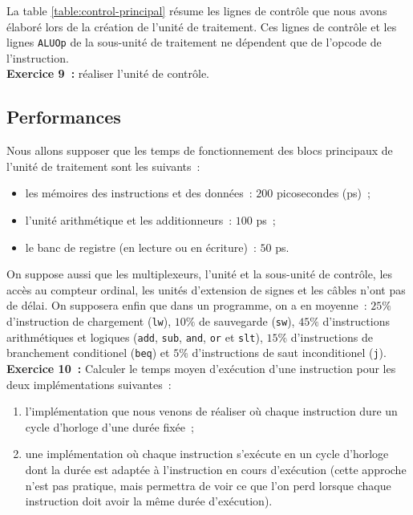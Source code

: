 \documentclass[12pt]{article}
\begin{document}
La table \ref{table:control-principal} résume les lignes de contrôle que nous avons élaboré lors de la création de l'unité de traitement. Ces lignes
de contrôle et les lignes \verb+ALUOp+ de la sous-unité de traitement ne dépendent que de l'opcode de l'instruction.\\

\textbf{Exercice 9~:} réaliser l'unité de contrôle.

\subsection{Performances}

Nous allons supposer que les temps de fonctionnement des blocs principaux de l'unité de traitement sont les suivants~:
\begin{itemize}
\item les mémoires des instructions et des données~: $200$ picosecondes (ps)~;
\item l'unité arithmétique et les additionneurs~: $100$ ps~;
\item le banc de registre (en lecture ou en écriture)~: $50$ ps.\\
\end{itemize}

On suppose aussi que les multiplexeurs, l'unité et la sous-unité de contrôle, les accès au compteur ordinal, les unités d'extension de signes et les câbles
n'ont pas de délai. On supposera enfin que dans un programme, on a en moyenne~: $25\%$ d'instruction de chargement (\verb+lw+), $10\%$ de
sauvegarde (\verb+sw+), $45\%$ d'instructions
arithmétiques et logiques (\verb+add+, \verb+sub+, \verb+and+, \verb+or+ et \verb+slt+), $15\%$ d'instructions de branchement conditionel (\verb+beq+)
et $5\%$ d'instructions de saut inconditionel (\verb+j+).\\

\textbf{Exercice 10~:} Calculer le temps moyen d'exécution d'une instruction pour les deux implémentations suivantes~:
\begin{enumerate}
\item l'implémentation que nous venons de réaliser où chaque instruction dure un cycle d'horloge d'une durée fixée~;
\item une implémentation où chaque instruction s'exécute en un cycle d'horloge dont la durée est adaptée à l'instruction en cours d'exécution (cette
approche n'est pas pratique, mais permettra de voir ce que l'on perd lorsque chaque instruction doit avoir la même durée d'exécution).
\end{enumerate}
\end{document}
